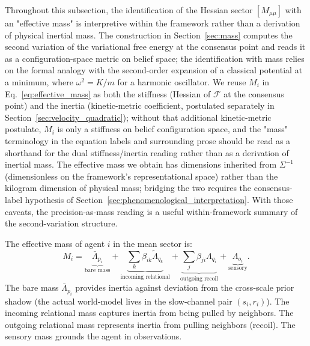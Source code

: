 \documentclass[11pt]{article}
\begin{document}
Throughout this subsection, the identification of the Hessian sector $[M_{\mu\mu}]$ with an "effective mass" is interpretive within the framework rather than a derivation of physical inertial mass. The construction in Section~\ref{sec:mass} computes the second variation of the variational free energy at the consensus point and reads it as a configuration-space metric on belief space; the identification with mass relies on the formal analogy with the second-order expansion of a classical potential at a minimum, where $\omega^2 = K/m$ for a harmonic oscillator. We reuse $M_i$ in Eq.~\eqref{eq:effective_mass} as both the stiffness (Hessian of $\mathcal{F}$ at the consensus point) and the inertia (kinetic-metric coefficient, postulated separately in Section~\ref{sec:velocity_quadratic}); without that additional kinetic-metric postulate, $M_i$ is only a stiffness on belief configuration space, and the "mass" terminology in the equation labels and surrounding prose should be read as a shorthand for the dual stiffness/inertia reading rather than as a derivation of inertial mass. The effective mass we obtain has dimensions inherited from $\Sigma^{-1}$ (dimensionless on the framework's representational space) rather than the kilogram dimension of physical mass; bridging the two requires the consensus-label hypothesis of Section~\ref{sec:phenomenological_interpretation}. With those caveats, the precision-as-mass reading is a useful within-framework summary of the second-variation structure.

The effective mass of agent $i$ in the mean sector is:
\begin{equation}
M_i = \underbrace{\bar{\Lambda}_{p_i}}_{\text{bare mass}} + \underbrace{\sum_k \beta_{ik}\tilde{\Lambda}_{q_k}}_{\text{incoming relational}} + \underbrace{\sum_j \beta_{ji}\Lambda_{q_i}}_{\text{outgoing recoil}} + \underbrace{\Lambda_{o_i}}_{\text{sensory}}.
\label{eq:effective_mass}
\end{equation}
The bare mass $\bar{\Lambda}_{p_i}$ provides inertia against deviation from the cross-scale prior shadow (the actual world-model lives in the slow-channel pair $(s_i, r_i)$). The incoming relational mass captures inertia from being pulled by neighbors. The outgoing relational mass represents inertia from pulling neighbors (recoil). The sensory mass grounds the agent in observations.
\end{document}

